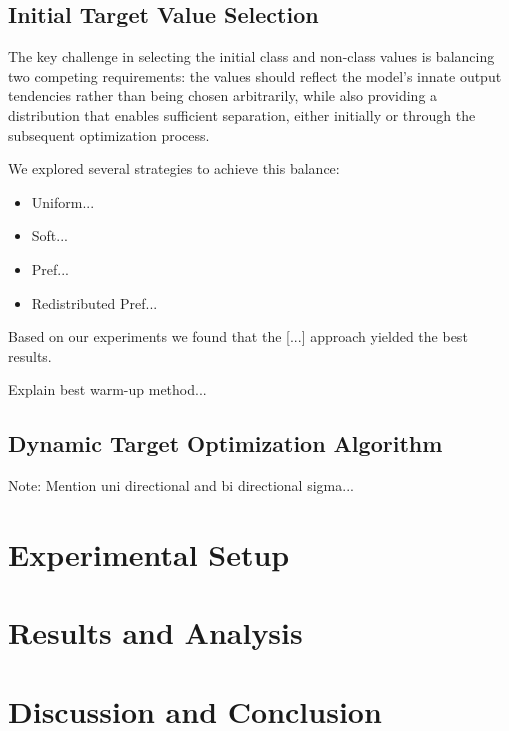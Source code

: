 \documentclass[12pt,fleqn,a4paper]{article}
\begin{document}
\subsection{Initial Target Value Selection}
The key challenge in selecting the initial class and non-class values is balancing two competing requirements: the values should reflect the model's innate output tendencies rather than being chosen arbitrarily, while also providing a distribution that enables sufficient separation, either initially or through the subsequent optimization process.

We explored several strategies to achieve this balance:
\begin{itemize}
    \item Uniform...
    \item Soft...
    \item Pref...
    \item Redistributed Pref...
\end{itemize}

Based on our experiments we found that the [...] approach yielded the best results.

\vspace{2em}

Explain best warm-up method...

\subsection{Dynamic Target Optimization Algorithm}
Note: Mention uni directional and bi directional sigma...

\section{Experimental Setup}

\section{Results and Analysis}

\section{Discussion and Conclusion}

\newpage
\end{document}
